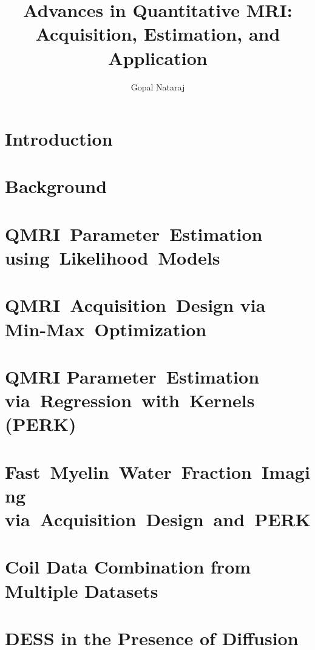 \documentclass[thesis]{../cls/thesis-umich}
\title{
	Advances in Quantitative MRI: \\
	Acquisition,
	Estimation,
	and 
	Application
}
\author{Gopal Nataraj}
\begin{document}
\chapter{Introduction}
\label{c,intro}


\chapter{Background}
\label{c,bkgrd}


\chapter{QMRI~Parameter~Estimation using~Likelihood~Models}
\label{c,relax}


\chapter{QMRI~Acquisition~Design via Min-Max~Optimization}
\label{c,scn-dsgn}


\chapter{QMRI Parameter~Estimation via~Regression~with~Kernels (PERK)}
\label{c,perk}


\chapter{Fast~Myelin~Water~Fraction~Imaging via~Acquisition~Design~and~PERK}
\label{c,mwf}


% 

\appendix
\chapter{Coil Data Combination from Multiple Datasets}
\label{a,cc-multi}


\chapter{DESS in the Presence of Diffusion}
\label{a,dess-diff}




\end{document}
